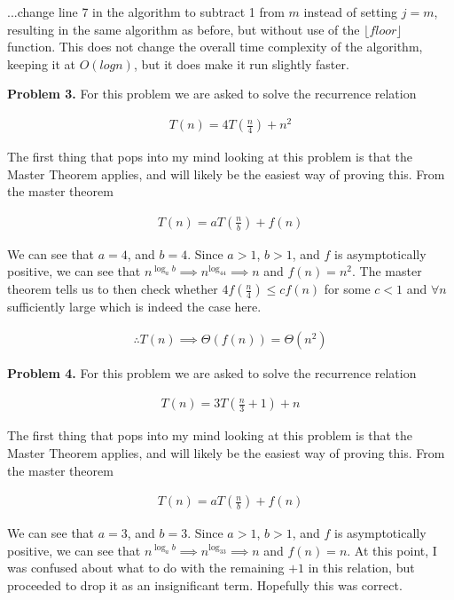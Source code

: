 \documentclass{article}
\begin{document}
...change line 7 in the algorithm to subtract 1 from $m$ instead of setting $j = m$, resulting in the same algorithm as before, but without use of the $\lfloor floor \rfloor$ function. This does not change the overall time complexity of the algorithm, keeping it at $O(logn)$, but it does make it run slightly faster. 

\hfill

\textbf{Problem 3.} For this problem we are asked to solve the recurrence relation

\begin{gather}
    T(n) = 4T(\frac{n}{4}) + n^2
\end{gather}

The first thing that pops into my mind looking at this problem is that the Master Theorem applies, and will likely be the easiest way of proving this. From the master theorem

\begin{gather}
    T(n) = aT(\frac{n}{b}) + f(n)
\end{gather}


We can see that $a = 4$, and $b = 4$. Since $a > 1$, $b > 1$, and $f$ is asymptotically positive, we can see that $n^{\log_ab} \implies n^{\log_44} \implies n$ and $f(n) = n^2$. The master theorem tells us to then check whether $4f(\frac{n}{4}) \leq cf(n)$ for some $c < 1$ and $\forall n$ sufficiently large which is indeed the case here.

\begin{gather}
    \therefore T(n) \implies \Theta(f(n)) = \Theta(n^2)
\end{gather}

\textbf{Problem 4.} For this problem we are asked to solve the recurrence relation

\begin{gather}
    T(n) = 3T(\frac{n}{3} + 1) + n
\end{gather}

The first thing that pops into my mind looking at this problem is that the Master Theorem applies, and will likely be the easiest way of proving this. From the master theorem

\begin{gather}
    T(n) = aT(\frac{n}{b}) + f(n)
\end{gather}


We can see that $a = 3$, and $b = 3$. Since $a > 1$, $b > 1$, and $f$ is asymptotically positive, we can see that $n^{\log_ab} \implies n^{\log_33} \implies n$ and $f(n) = n$. At this point, I was confused about what to do with the remaining $+1$ in this relation, but proceeded to drop it as an insignificant term. Hopefully this was correct.
\end{document}
